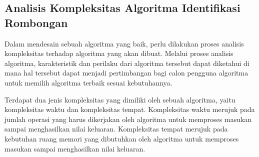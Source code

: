 \subsection{Analisis Kompleksitas Algoritma Identifikasi Rombongan}
\label{subsec:complexity}

Dalam mendesain sebuah algoritma yang baik, perlu dilakukan proses analisis kompleksitas terhadap algoritma yang akan dibuat. Melalui proses analisis algoritma, karakteristik dan perilaku dari algoritma tersebut dapat diketahui di mana hal tersebut dapat menjadi pertimbangan bagi calon pengguna algoritma untuk memilih algoritma terbaik sesuai kebutuhannya.

Terdapat dua jenis kompleksitas yang dimiliki oleh sebuah algoritma, yaitu kompleksitas waktu dan kompleksitas tempat. Kompleksitas waktu merujuk pada jumlah operasi yang harus dikerjakan oleh algoritma untuk memproses masukan sampai menghasilkan nilai keluaran. Kompleksitas tempat merujuk pada kebutuhan ruang memori yang dibutuhkan oleh algoritma untuk memproses masukan sampai menghasilkan nilai keluaran.

\clearpage

